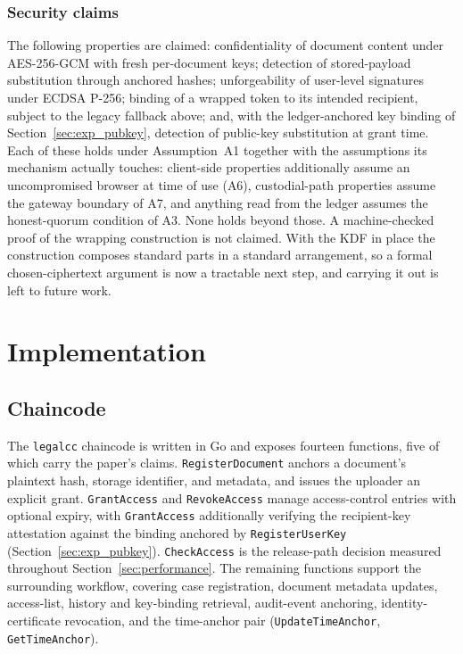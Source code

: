 \documentclass[preprint,12pt]{elsarticle}
\begin{document}
\subsubsection{Security claims}
\label{sec:cryptoclaims}
The following properties are claimed: confidentiality of document content
under AES-256-GCM with fresh per-document keys; detection of stored-payload
substitution through anchored hashes; unforgeability of user-level signatures
under ECDSA P-256; binding of a wrapped token to its intended recipient,
subject to the legacy fallback above; and, with the ledger-anchored key binding
of Section~\ref{sec:exp_pubkey}, detection of public-key substitution at grant
time. Each of these holds under Assumption~A1 together with the assumptions its
mechanism actually touches: client-side properties additionally assume an
uncompromised browser at time of use (A6), custodial-path properties assume
the gateway boundary of A7, and anything read from the ledger assumes the
honest-quorum condition of A3. None holds beyond those. A machine-checked proof of
the wrapping construction is not claimed. With the KDF in place the
construction composes standard parts in a standard arrangement, so a formal
chosen-ciphertext argument is now a tractable next step, and carrying it out is
left to future work.


\section{Implementation}
\label{sec:implementation}

\subsection{Chaincode}
\label{sec:chaincode}

The \texttt{legalcc} chaincode is written in Go and exposes fourteen
functions, five of which carry the paper's claims. \texttt{RegisterDocument}
anchors a document's plaintext hash, storage identifier, and metadata, and
issues the uploader an explicit grant. \texttt{GrantAccess} and
\texttt{RevokeAccess} manage access-control entries with optional expiry,
with \texttt{GrantAccess} additionally verifying the recipient-key
attestation against the binding anchored by \texttt{RegisterUserKey}
(Section~\ref{sec:exp_pubkey}). \texttt{CheckAccess} is the release-path
decision measured throughout Section~\ref{sec:performance}. The remaining
functions support the surrounding workflow, covering case registration,
document metadata updates, access-list, history and key-binding retrieval,
audit-event anchoring, identity-certificate revocation, and the time-anchor
pair (\texttt{UpdateTimeAnchor}, \texttt{GetTimeAnchor}).
\end{document}

